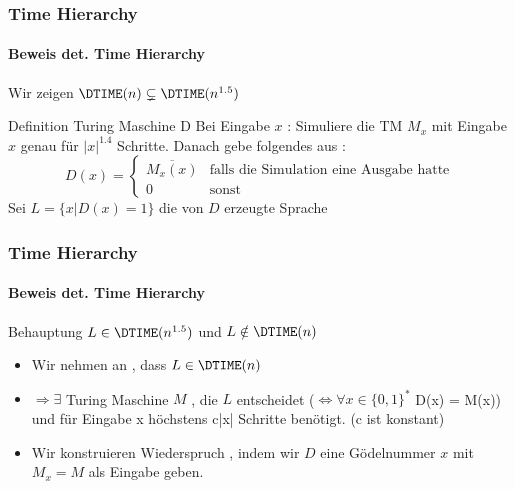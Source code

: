 \begin{frame}
	\frametitle{Time Hierarchy}
	\framesubtitle{{Beweis det. Time Hierarchy}}
	Wir zeigen $\DTIME(n) \subsetneq \DTIME(n^{1.5})$
	\bigskip
	\pause
	\begin{KITinfoblock}{Definition Turing Maschine D} 
		Bei Eingabe $x$ : Simuliere die TM $M_x$ mit Eingabe $x$ genau für $|x|^{1.4}$
		 						Schritte. Danach gebe folgendes aus :
		\begin{equation*}
		D(x) = 
		\begin{cases}
			\overline{M_x(x)} & \text{falls die Simulation eine Ausgabe hatte} \\
			0 & \text{sonst}
			
		\end{cases}
		\end{equation*}			
		\bigskip
		Sei $L =  \lbrace x \vert D(x) = 1  \rbrace$ die von $D$ erzeugte Sprache
	\end{KITinfoblock}
\end{frame}

\begin{frame}
	\frametitle{Time Hierarchy}
	\framesubtitle{Beweis det. Time Hierarchy}
	\begin{KITblock}{Behauptung}
		$L \in \DTIME(n^{1.5})$ und $L \notin \DTIME(n)$
	\end{KITblock}
	\pause
	\begin{itemize}[<+->]
		\item Wir nehmen an , dass $L \in \DTIME(n)$
		\item $\Rightarrow \exists$ Turing Maschine $M$ , die $L$ entscheidet \newline
		($\Leftrightarrow \forall x \in {\lbrace 0,1 \rbrace }^{*}$ D(x) = M(x)) und
		für Eingabe x höchstens c|x| Schritte benötigt. (c ist konstant)
		\item Wir konstruieren Wiederspruch , indem wir $D$ eine Gödelnummer $x$ mit
			$M_x = M$ als Eingabe geben.
	\end{itemize}
\end{frame}

